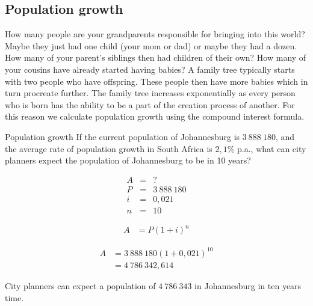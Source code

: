 \subsection{Population growth}

How many people are your grandparents responsible for bringing into this world? Maybe they just had one child (your mom or dad) or maybe they had a dozen. How many of your parent’s siblings then had children of their own? How many of your cousins have already started having babies? A family tree typically starts with two people who have offspring. These people then have more babies which in turn procreate further. The family tree increases exponentially as every person who is born has the ability to be a part of the creation process of another. For this reason we calculate population growth using the compound interest formula.


\begin{wex}{Population growth}
    {If the current population of Johannesburg is $3~888~180$, and the average rate of population growth in South Africa is $2,1\%$ p.a., what can city planners expect the population of Johannesburg to be in 10 years?}{
    
    \begin{eqnarray*}
	A &=& ?\\
	P &=& 3~888~180\\
	i &=& 0,021\\
	n &=& 10
    \end{eqnarray*}

    \begin{align*}
	A &= P(1 + i)^n
    \end{align*}

    \begin{align*}
	A &= 3~888~180(1 + 0,021)^{10}\\
	  &= 4~786~342,614
    \end{align*}

    City planners can expect a population of $4~786~343$ in Johannesburg in ten years time.
    }
\end{wex}


